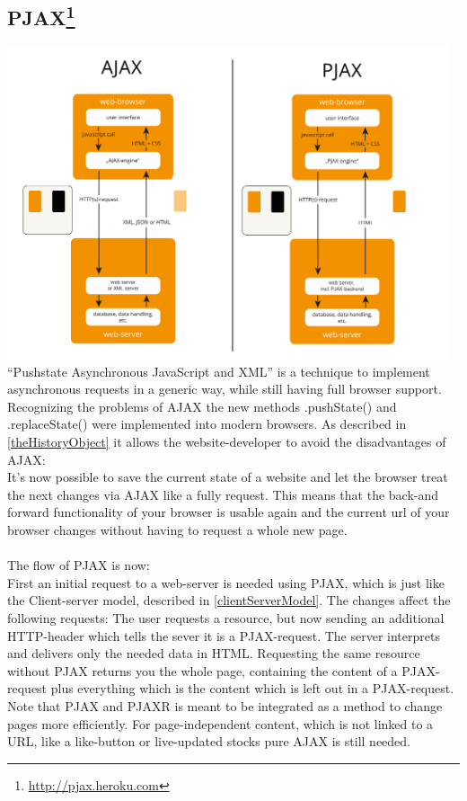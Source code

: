 \documentclass[f,bachelor,binding,twoside,palatino]{WeSTthesis}
\begin{document}
  
  \subsection[PJAX]{\gls{PJAX}\footnote{\url{http://pjax.heroku.com}}\label{pjax}}
	\includegraphics[width=13cm]{images/ajax_vs_pjax}\\
	\enquote{Pushstate Asynchronous JavaScript and XML} is a technique to implement asynchronous requests in a generic way, while still having full browser support.
    Recognizing the problems of \gls{AJAX} the new methods .pushState() and .replaceState() were implemented into modern browsers.
    As described in \ref{theHistoryObject} it allows the website-developer to avoid the disadvantages of \gls{AJAX}:\\
    It's now possible to save the current state of a website and let the browser treat the next changes via \gls{AJAX} like a fully request.
    This means that the back-and forward functionality of your browser is usable again and the current url of your browser changes without having to request a whole new page.\\\\
    The flow of \gls{PJAX} is now:\\
    First an initial request to a web-server is needed using \gls{PJAX}, which is just like the Client-server model, described in \ref{clientServerModel}.
    The changes affect the following requests: 
    The user requests a resource, but now sending an additional HTTP-header which tells the sever it is a \gls{PJAX}-request.
    The server interprets and delivers only the needed data in HTML.
    Requesting the same resource without \gls{PJAX} returns you the whole page, containing the content of a \gls{PJAX}-request plus everything which is the content which is left out in a \gls{PJAX}-request.
    Note that \gls{PJAX} and \gls{PJAXR} is meant to be integrated as a method to change pages more efficiently.
    For page-independent content, which is not linked to a URL, like a like-button or live-updated stocks pure \gls{AJAX} is still needed.
\end{document}
